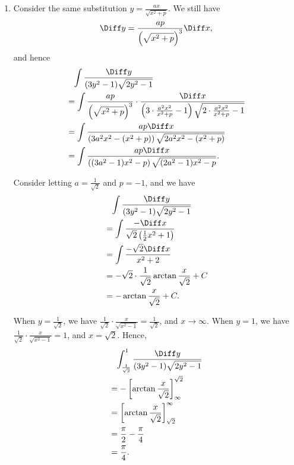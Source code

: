 \begin{enumerate}
    \item Consider the same substitution \(y = \frac{ax}{\sqrt{x^2 + p}}\). We still have
          \[
              \Diff y = \frac{ap}{\left(\sqrt{x^2 + p}\right)^3} \Diff x,
          \]
          and hence
          \begin{align*}
               & \phantom{=} \int \frac{\Diff y}{(3y^2 - 1) \sqrt{2y^2 - 1}}                                                                                                       \\
               & = \int \frac{ap}{\left(\sqrt{x^2 + p}\right)^3} \cdot \frac{\Diff x}{\left(3 \cdot \frac{a^2 x^2}{x^2 + p} - 1\right) \sqrt{2 \cdot \frac{a^2 x^2}{x^2 + p} - 1}} \\
               & = \int \frac{ap \Diff x}{\left(3 a^2 x^2 - (x^2 + p)\right) \sqrt{2 a^2 x^2 - (x^2 + p)}}                                                                         \\
               & = \int \frac{ap \Diff x}{\left((3 a^2 - 1) x^2 - p\right) \sqrt{(2 a^2 - 1) x^2 - p}}.
          \end{align*}

          Consider letting \(a = \frac{1}{\sqrt{2}}\) and \(p = -1\), and we have
          \begin{align*}
               & \phantom{=} \int \frac{\Diff y}{(3y^2 - 1) \sqrt{2y^2 - 1}}         \\
               & =  \int \frac{-\Diff x}{\sqrt{2} \left(\frac{1}{2} x^2 + 1\right)}  \\
               & = \int \frac{- \sqrt{2}\Diff x}{x^2 + 2}                            \\
               & = -\sqrt{2} \cdot \frac{1}{\sqrt{2}} \arctan \frac{x}{\sqrt{2}} + C \\
               & = - \arctan \frac{x}{\sqrt{2}} + C.
          \end{align*}

          When \(y = \frac{1}{\sqrt{2}}\), we have \(\frac{1}{\sqrt{2}} \cdot \frac{x}{\sqrt{x^2 - 1}} = \frac{1}{\sqrt{2}}\), and \(x \to \infty\). When \(y = 1\), we have \(\frac{1}{\sqrt{2}} \cdot \frac{x}{\sqrt{x^2 - 1}} = 1\), and \(x = \sqrt{2}\). Hence,
          \begin{align*}
               & \phantom{=} \int_{\frac{1}{\sqrt{2}}}^1 \frac{\Diff y}{(3y^2 - 1) \sqrt{2y^2 - 1}} \\
               & = -\left[\arctan \frac{x}{\sqrt{2}}\right]_{\infty}^{\sqrt{2}}                     \\
               & = \left[\arctan \frac{x}{\sqrt{2}}\right]_{\sqrt{2}}^{\infty}                      \\
               & = \frac{\pi}{2} - \frac{\pi}{4}                                                    \\
               & = \frac{\pi}{4}.
          \end{align*}
\end{enumerate}